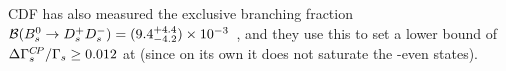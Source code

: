 {%

CDF has also measured the exclusive branching fraction 
${\cal B}(B^0_s \to D^+_s D^-_s) = 
(9.4^{+4.4}_{-4.2}) \times 10^{-3}$~\cite{Abulencia:2007zz}, and
they use this to set a lower bound of
$\Delta\Gamma_{s}^{C\!P}/\Gamma_{s} \geq 0.012$ at  (since
on its own it does not saturate the \CP-even states).

} %

